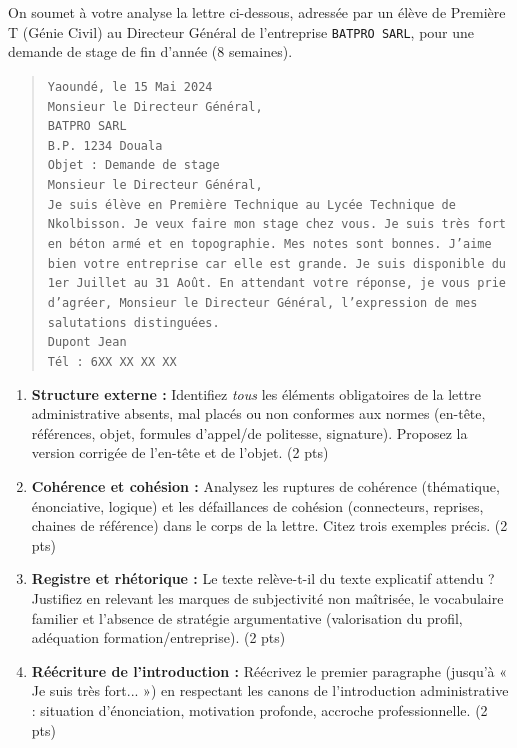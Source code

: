 \documentclass[11pt]{article}
\begin{document}
\begin{exercice}
On soumet à votre analyse la lettre ci-dessous, adressée par un élève de Première T (Génie Civil) au Directeur Général de l'entreprise \texttt{BATPRO SARL}, pour une demande de stage de fin d'année (8 semaines).

\begin{quote}
\texttt{Yaoundé, le 15 Mai 2024\\
Monsieur le Directeur Général,\\
BATPRO SARL\\
B.P. 1234 Douala\\
Objet : Demande de stage\\
Monsieur le Directeur Général,\\
Je suis élève en Première Technique au Lycée Technique de Nkolbisson. Je veux faire mon stage chez vous. Je suis très fort en béton armé et en topographie. Mes notes sont bonnes. J'aime bien votre entreprise car elle est grande. Je suis disponible du 1er Juillet au 31 Août. En attendant votre réponse, je vous prie d'agréer, Monsieur le Directeur Général, l'expression de mes salutations distinguées.\\
Dupont Jean\\
Tél : 6XX XX XX XX}
\end{quote}

\begin{enumerate}
    \item \textbf{Structure externe :} Identifiez \textit{tous} les éléments obligatoires de la lettre administrative absents, mal placés ou non conformes aux normes (en-tête, références, objet, formules d'appel/de politesse, signature). Proposez la version corrigée de l'en-tête et de l'objet. \hfill (2 pts)
    \item \textbf{Cohérence et cohésion :} Analysez les ruptures de cohérence (thématique, énonciative, logique) et les défaillances de cohésion (connecteurs, reprises, chaines de référence) dans le corps de la lettre. Citez trois exemples précis. \hfill (2 pts)
    \item \textbf{Registre et rhétorique :} Le texte relève-t-il du texte explicatif attendu ? Justifiez en relevant les marques de subjectivité non maîtrisée, le vocabulaire familier et l'absence de stratégie argumentative (valorisation du profil, adéquation formation/entreprise). \hfill (2 pts)
    \item \textbf{Réécriture de l'introduction :} Réécrivez le premier paragraphe (jusqu'à « Je suis très fort... ») en respectant les canons de l'introduction administrative : situation d'énonciation, motivation profonde, accroche professionnelle. \hfill (2 pts)
\end{enumerate}
\end{exercice}
\end{document}
